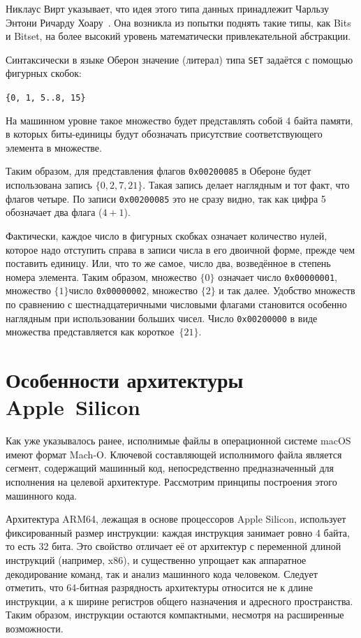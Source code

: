 \documentclass[utf8]{lgu}
\newcommand{\tire}{\unskip\nobreak\thinspace\textemdash\thinspace}
\newcommand{\code}[1]{{\normalsize\texttt{#1}}}
\begin{document}
Никлаус Вирт указывает, что идея этого типа данных принадлежит Чарльзу Энтони Ричарду Хоару~\cite{WirthSet}. Она возникла из попытки поднять такие типы, как Bits и Bitset, на более высокий уровень математически привлекательной абстракции.

Синтаксически в языке Оберон значение (литерал) типа \code{SET} задаётся с помощью фигурных скобок:

\begin{center}
\code{\{0, 1, 5..8, 15\}}
\end{center}

На машинном уровне такое множество будет представлять собой 4 байта памяти, в которых биты-единицы будут обозначать присутствие соответствующего элемента в множестве.

Таким образом, для представления флагов \code{0x00200085} в Обероне будет использована запись $\{0, 2, 7, 21\}$. Такая запись делает наглядным и тот факт, что флагов четыре. По записи \code{0x00200085} это не сразу видно, так как цифра 5 обозначает два флага ($4 + 1$).

Фактически, каждое число в фигурных скобках означает количество нулей, которое надо отступить справа в записи числа в его двоичной форме, прежде чем поставить единицу. Или, что то же самое, число два, возведённое в степень номера элемента. Таким образом, множество $\{0\}$ означает число \code{0x00000001}, множество $\{1\}$\tire число \code{0x00000002}, множество $\{2\}$\tire \code{0x00000004} и так далее. Удобство множеств по сравнению с шестнадцатеричными числовыми флагами становится особенно наглядным при использовании больших чисел. Число \code{0x00200000} в виде множества представляется как короткое~$\{21\}$.

\section{Особенности архитектуры Apple~Silicon}

\firstparskip Как уже указывалось ранее, исполнимые файлы в операционной системе macOS имеют формат Mach‑O. Ключевой составляющей исполнимого файла является сегмент, содержащий машинный код, непосредственно предназначенный для исполнения на целевой архитектуре. Рассмотрим принципы построения этого машинного кода.

Архитектура ARM64, лежащая в основе процессоров Apple Silicon, использует фиксированный размер инструкции: каждая инструкция занимает ровно 4 байта, то есть 32 бита. Это свойство отличает её от архитектур с переменной длиной инструкций (например, x86), и существенно упрощает как аппаратное декодирование команд, так и анализ машинного кода человеком. Следует отметить, что 64-битная разрядность архитектуры относится не к длине инструкции, а к ширине регистров общего назначения и адресного пространства. Таким образом, инструкции остаются компактными, несмотря на расширенные возможности.
\end{document}
